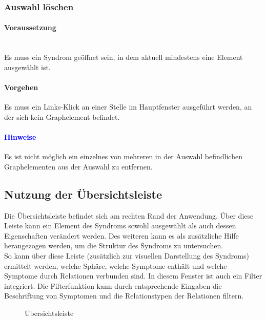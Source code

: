 \documentclass[enabledeprecatedfontcommands,fontsize=11pt,paper=a4,twoside]{scrartcl}
\newcounter{one}
\newcounter{two}[one]
\newcommand*{\hint}{\paragraph{\textcolor{blue}{Hinweise}}}
\newcommand*{\condition}{\paragraph{Voraussetzung}$\;$ \vspace{0.2cm}\\}
\newcommand*{\action}{\paragraph{Vorgehen}}
\let\tempone\itemize
\let\temptwo\enditemize
\renewenvironment{itemize}{\tempone\addtolength{\itemsep}{-10.0pt}}{\temptwo}
\let\origenumerate\enumerate
\let\origendenumerate\endenumerate
\renewenvironment{enumerate}{\origenumerate \addtolength{\itemsep}{-10.0pt}}{\origendenumerate}
\begin{document}
	\subsubsection{Auswahl löschen}
	\condition
	Es muss ein Syndrom geöffnet sein, in dem aktuell mindestens eine Element ausgewählt ist. 
	\action
	\begin{enumerate}
		\item Es muss ein Links-Klick an einer Stelle im Hauptfenster ausgeführt werden, an der sich kein Graphelement befindet.
	\end{enumerate}
	\hint
	\begin{itemize}
		\item Es ist nicht möglich ein einzelnes von mehreren in der Auswahl befindlichen Graphelementen aus der Auswahl zu entfernen.
	\end{itemize}
	
		\newpage
		\subsection{Nutzung der Übersichtsleiste} \label{overwiew}
		Die Übersichtsleiste befindet sich am rechten Rand der Anwendung. Über diese Leiste kann ein Element des Syndroms sowohl ausgewählt als auch dessen Eigenschaften verändert werden. Des weiteren kann es als zusätzliche Hilfe herangezogen werden, um die Struktur des Syndroms zu untersuchen. \\
		So kann über diese Leiste (zusätzlich zur visuellen Darstellung des Syndroms) ermittelt werden, welche Sphäre, welche Symptome enthält und welche Symptome durch Relationen verbunden sind. In diesem Fenster ist auch ein Filter integriert. Die Filterfunktion kann durch entsprechende Eingaben die Beschriftung von Symptomen und die Relationstypen der Relationen filtern.
		
		\begin{figure}[ht!]
			\centering
			\caption{Übersichtsleiste}
			
		\end{figure}
\end{document}
